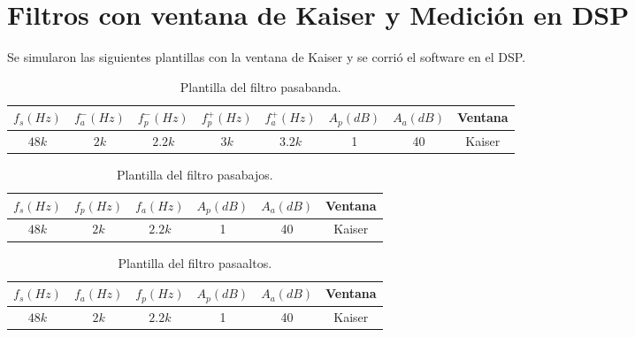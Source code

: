 \section{Filtros con ventana de Kaiser y Medición en DSP}
Se simularon las siguientes plantillas con la ventana de Kaiser y se corrió el software en el DSP.

\begin{table}[H]
\centering
\begin{tabular}{|c|c|c|c|c|c|c|c|}
\hline
$f_s(Hz)$ & $f_a^-(Hz)$ & $f_p^-(Hz)$ & $f_p^+(Hz)$ & $f_a^+(Hz)$ & $A_p(dB)$ & $A_a(dB)$ & Ventana     \\ \hline
$48k$     & $2k$        & $2.2k$      &   $3k$      &     $3.2k$ &  1         & 40        & Kaiser      \\ \hline
\end{tabular}
\caption{Plantilla del filtro pasabanda.}
\label{tab:3passband}
\end{table}

\begin{table}[H]
\centering
\begin{tabular}{|c|c|c|c|c|c|}
\hline
$f_s(Hz)$ & $f_p(Hz)$ & $f_a(Hz)$ & $A_p(dB)$ & $A_a(dB)$ & Ventana     \\ \hline
$48k$     & $2k$        & $2.2k$  &  1         & 40       & Kaiser      \\ \hline
\end{tabular}
\caption{Plantilla del filtro pasabajos.}
\label{tab:3lowpass}
\end{table}

\begin{table}[H]
\centering
\begin{tabular}{|c|c|c|c|c|c|}
\hline
$f_s(Hz)$ & $f_a(Hz)$ & $f_p(Hz)$ & $A_p(dB)$ & $A_a(dB)$ & Ventana     \\ \hline
$48k$     & $2k$        & $2.2k$  &  1         & 40       & Kaiser      \\ \hline
\end{tabular}
\caption{Plantilla del filtro pasaaltos.}
\label{tab:3hipass}
\end{table}


